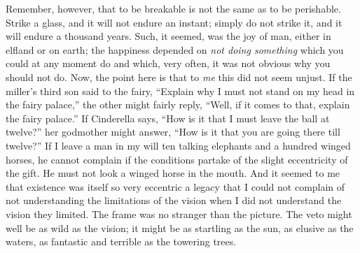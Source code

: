 \documentclass{book}
\begin{document}
Remember, however, that to be breakable is not the same as to be perishable. Strike a glass, and it will not endure an instant; simply do not strike it, and it will endure a thousand years. Such, it seemed, was the joy of man, either in elfland or on earth; the happiness depended on \emph{not doing something} which you could at any moment do and which, very often, it was not obvious why you should not do. Now, the point here is that to \emph{me} this did not seem unjust. If the miller’s third son said to the fairy, “Explain why I must not stand on my head in the fairy palace,” the other might fairly reply, “Well, if it comes to that, explain the fairy palace.” If Cinderella says, “How is it that I must leave the ball at twelve?” her godmother might answer, “How is it that you are going there till twelve?” If I leave a man in my will ten talking elephants and a hundred winged horses, he cannot complain if the conditions partake of the slight eccentricity of the gift. He must not look a winged horse in the mouth. And it seemed to me that existence was itself so very eccentric a legacy that I could not complain of not understanding the limitations of the vision when I did not understand the vision they limited. The frame was no stranger than the picture. The veto might well be as wild as the vision; it might be as startling as the sun, as elusive as the waters, as fantastic and terrible as the towering trees.
\end{document}

